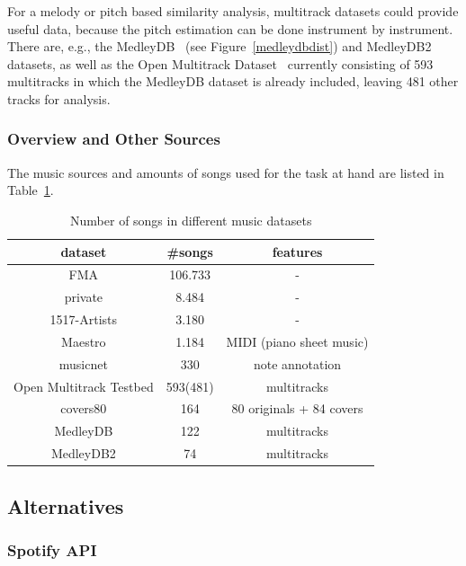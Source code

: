 For a melody or pitch based similarity analysis, multitrack datasets could provide useful data, because the pitch estimation can be done instrument by instrument. There are, e.g., the MedleyDB~\cite{medleydb1} (see Figure~\ref{medleydbdist}) and MedleyDB2~\cite{medleydb2} datasets, as well as the Open Multitrack Dataset~\cite{openmult1} currently consisting of 593 multitracks in which the MedleyDB dataset is already included, leaving 481 other tracks for analysis.

\subsubsection{Overview and Other Sources}

The music sources and amounts of songs used for the task at hand are listed in Table~\ref{table_dsets}.

\begin{table}[h]
	\begin{center}
		\begin{tabular}{|c||c|c|}
			\hline
			dataset & \#songs & features\\
			\hline
			\hline
			FMA & 106.733 & -\\
			\hline
			private & 8.484 & -\\
			\hline
			1517-Artists & 3.180 & -\\
			\hline
			Maestro & 1.184 & MIDI (piano sheet music)\\
			\hline
			musicnet & 330  & note annotation\\
			\hline
			Open Multitrack Testbed & 593(481) & multitracks\\
			\hline
			covers80 & 164  & 80 originals + 84 covers\\
			\hline
			MedleyDB &  122  & multitracks\\
			\hline
			MedleyDB2 &  74  & multitracks\\
			\hline
		\end{tabular}
	\end{center}
	\caption{Number of songs in different music datasets}
	\label{table_dsets}
\end{table}
\FloatBarrier

\subsection{Alternatives}

\subsubsection{Spotify API}\label{spotipy}

